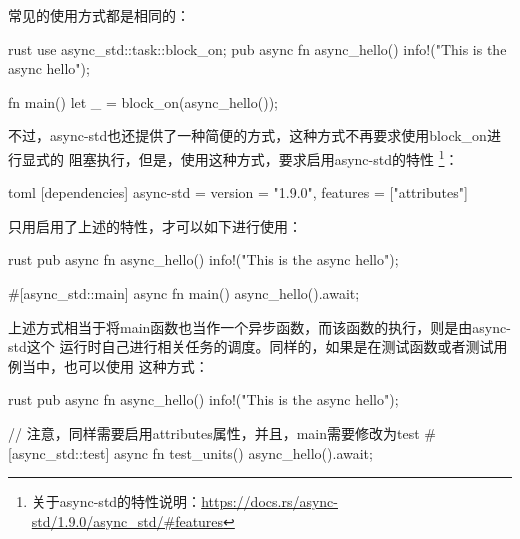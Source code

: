 常见的使用方式都是相同的：
\begin{code-block}{rust}
use async_std::task::block_on;
pub async fn async_hello() {
    info!("This is the async hello");
}

fn main() {
    let _ = block_on(async_hello());
}

\end{code-block}

不过，async-std也还提供了一种简便的方式，这种方式不再要求使用block\_on进行显式的
阻塞执行，但是，使用这种方式，要求启用async-std的特性
\footnote{关于async-std的特性说明：\url{https://docs.rs/async-std/1.9.0/async_std/\#features}}：
\begin{code-block}{toml}
[dependencies]
async-std = {version = "1.9.0", features = ["attributes"]}
\end{code-block}
只用启用了上述的特性，才可以如下进行使用：
\begin{code-block}{rust}
pub async fn async_hello() {
    info!("This is the async hello");
}

#[async_std::main]
async fn main() {
    async_hello().await;
}
\end{code-block}
上述方式相当于将main函数也当作一个异步函数，而该函数的执行，则是由async-std这个
运行时自己进行相关任务的调度。同样的，如果是在测试函数或者测试用例当中，也可以使用
这种方式：
\begin{code-block}{rust}
pub async fn async_hello() {
    info!("This is the async hello");
}

// 注意，同样需要启用attributes属性，并且，main需要修改为test
#[async_std::test]
async fn test_units() {
    async_hello().await;
}
\end{code-block}

